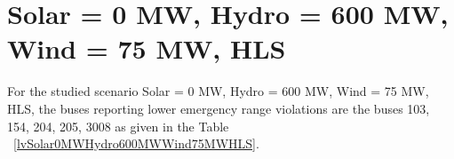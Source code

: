 \documentclass[10pt]{report}
\begin{document}
\section{Solar = 0 MW, Hydro = 600 MW, Wind = 75 MW, HLS}
For the studied scenario Solar = 0 MW, Hydro = 600 MW, Wind = 75 MW, HLS, the buses reporting lower emergency range violations are the buses 103, 154, 204, 205, 3008 as given in the Table ~\ref{lvSolar0MWHydro600MWWind75MWHLS}.
\begin{table}[H]
\caption{Contingencies reporting bus voltages lower than emergency voltage of 1.1 PU for scenario Solar = 0 MW, Hydro = 600 MW, Wind = 75 MW, HLS}
\label{lvSolar0MWHydro600MWWind75MWHLS}
\centering
{}
\end{table}
\end{document}
